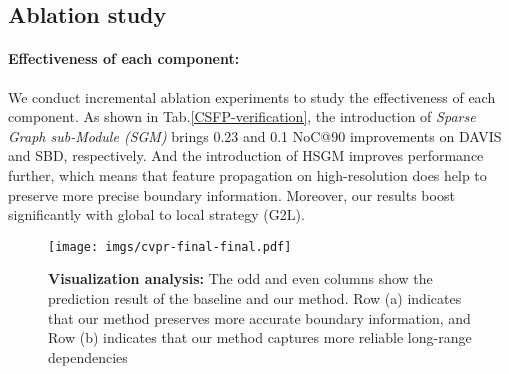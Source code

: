 \documentclass{bmvc2k}
\begin{document}
\subsection{Ablation study}


\paragraph{\textbf{Effectiveness of each component:}}  We conduct incremental ablation experiments to study the effectiveness 
of each component. As shown in Tab.\ref{CSFP-verification}, the introduction of \textit{Sparse Graph sub-Module (SGM)} brings 0.23 and 0.1 NoC@90 improvements on DAVIS and SBD, respectively. And the introduction of HSGM improves performance further, which means that feature propagation on high-resolution does help to preserve more precise boundary information. Moreover, our results boost significantly with global to local strategy (G2L).
\begin{table*}[!tp]
    \centering
     \caption{\small{Graph design analysis on DAVIS. 
 Low resolution denotes 1/4 feature map while high resolution represents 1/2 scale feature map.}}
 \label{graph-compare}

\end{table*}

\begin{figure*}[!t]
    \centering
    \texttt{[image: imgs/cvpr-final-final.pdf]}
    \caption{\small{\textbf{Visualization analysis:} The odd and even columns show the prediction result of the baseline and our method. 
Row (a) indicates that our method preserves more accurate boundary information, and Row (b) indicates that our method captures more 
    reliable long-range dependencies}}
    \label{vis-fig:2}
\end{figure*}
\end{document}
